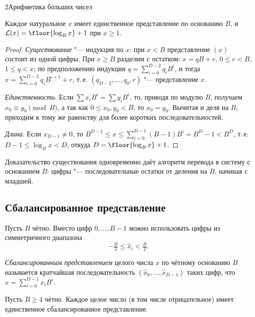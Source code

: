 \begin{lecture}{2}{Арифметика больших чисел}
\begin{theorem}\label{l2:repr}
Каждое натуральное $x$ имеет единственное представление по основанию $B$, и
$\Len(x) = \floor{\log_B x} + 1$ при $x \ge 1$.
\end{theorem}

\begin{proof}
\emph{Существование} "--- индукция по $x$: при $x < B$ представление $(x)$ состоит из одной
цифры. При $x \ge B$ разделим с остатком: $x = qB + r$, $0 \le r < B$, $1 \le q < x$; по
предположению индукции $q = \sum_{i=0}^{D-2} q_i B^i$, и тогда
$x = \sum_{i=0}^{D-2} q_i B^{i+1} + r$, т.\,е. $(q_{D-2}, \dots, q_0, r)$ "--- представление $x$.

\emph{Единственность}. Если $\sum x_i B^i = \sum y_i B^i$, то, приводя по модулю $B$, получаем
$x_0 \equiv y_0 \pmod B$, а так как $0 \le x_0, y_0 < B$, то $x_0 = y_0$. Вычитая и деля на $B$,
приходим к тому же равенству для более коротких последовательностей.

\emph{Длина}. Если $x_{D-1} \ne 0$, то
$B^{D-1} \le x \le \sum_{i=0}^{D-1} (B-1) B^i = B^D - 1 < B^D$, т.\,е.
$D - 1 \le \log_B x < D$, откуда $D = \floor{\log_B x} + 1$.
\end{proof}

Доказательство существования одновременно даёт алгоритм перевода в систему с основанием $B$:
цифры "--- последовательные остатки от деления на $B$, начиная с младшей.

\subsection{Сбалансированное представление}

Пусть $B$ чётно. Вместо цифр $0, \dots, B - 1$ можно использовать цифры из симметричного
диапазона
\[
  -\tfrac{B}{2} \le \hat x_i < \tfrac{B}{2}.
\]

\begin{definition}
\emph{Сбалансированным представлением} целого числа $x$ по чётному основанию $B$ называется
кратчайшая последовательность $(\hat x_0, \dots, \hat x_{D-1})$ таких цифр, что
$x = \sum_{i=0}^{D-1} \hat x_i B^i$.
\end{definition}

\begin{proposition}\label{l2:balanced}
Пусть $B \ge 4$ чётно. Каждое целое число (в том числе отрицательное) имеет единственное
сбалансированное представление.
\end{proposition}


\end{lecture}

